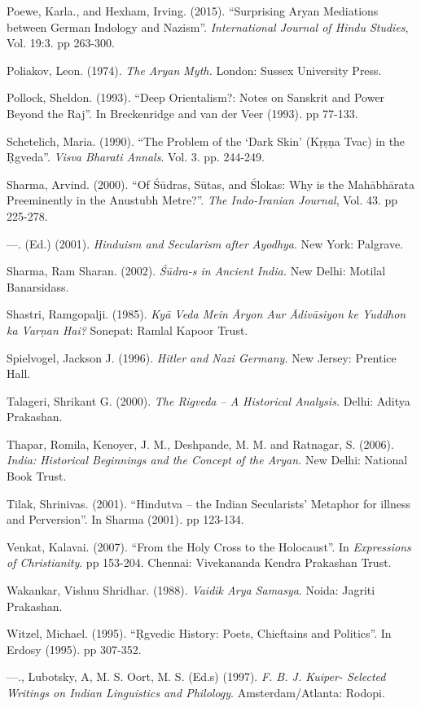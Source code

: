 \begin{thebibliography}{99}
  Poewe, Karla., and Hexham, Irving. (2015). “Surprising Aryan Mediations between German Indology and Nazism”. \textit{International Journal of Hindu Studies}, Vol. 19:3. pp 263-300.

  Poliakov, Leon. (1974). \textit{The Aryan Myth.} London: Sussex University Press.

  Pollock, Sheldon. (1993). “Deep Orientalism?: Notes on Sanskrit and Power Beyond the Raj”. In Breckenridge and van der Veer (1993)\textit{. }pp 77-133.

  Schetelich, Maria. (1990). “The Problem of the ‘Dark Skin’ (Kṛṣṇa Tvac) in the Ṛgveda”. \textit{Visva Bharati Annals}. Vol. 3. pp. 244-249.

  Sharma, Arvind. (2000). “Of Śūdras, Sūtas, and Ślokas: Why is the Mahābhārata Preeminently in the Anustubh Metre?”. \textit{The Indo-Iranian Journal}, Vol. 43. pp 225-278.

  —. (Ed.) (2001). \textit{Hinduism and Secularism after Ayodhya}. New York: Palgrave.

  Sharma, Ram Sharan. (2002). \textit{Śūdra-s in Ancient India.} New Delhi: Motilal Banarsidass.

  Shastri, Ramgopalji. (1985). \textit{Kyā Veda Mein Āryon Aur Ādivāsiyon ke Yuddhon ka Varṇan Hai?} Sonepat: Ramlal Kapoor Trust.

  Spielvogel, Jackson J. (1996). \textit{Hitler and Nazi Germany.} New Jersey: Prentice Hall.

  Talageri, Shrikant G. (2000). \textit{The Rigveda – A Historical Analysis.} Delhi: Aditya Prakashan.

  Thapar, Romila, Kenoyer, J. M., Deshpande, M. M. and Ratnagar, S. (2006). \textit{India: Historical Beginnings and the Concept of the Aryan. }New Delhi: National Book Trust.

  Tilak, Shrinivas. (2001). “Hindutva – the Indian Secularists’ Metaphor for illness and Perversion”. In Sharma (2001)\textit{.} pp 123-134.

  Venkat, Kalavai. (2007). “From the Holy Cross to the Holocaust”. In \textit{Expressions of Christianity}. pp 153-204. Chennai: Vivekananda Kendra Prakashan Trust.

  Wakankar, Vishnu Shridhar. (1988). \textit{Vaidik Arya Samasya}. Noida: Jagriti Prakashan.

  Witzel, Michael. (1995). “Ṛgvedic History: Poets, Chieftains and Politics”. In Erdosy (1995). pp 307-352.

  —., Lubotsky, A, M. S. Oort, M. S. (Ed.s) (1997). \textit{F. B. J. Kuiper- Selected Writings on Indian Linguistics and Philology}. Amsterdam/Atlanta: Rodopi.

 \end{thebibliography}

